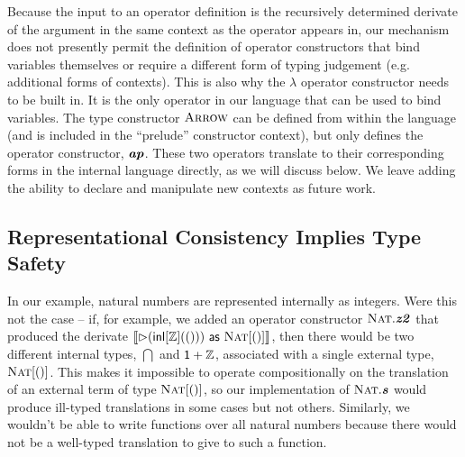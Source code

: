 \documentclass[9pt,preprint]{sigplanconf}
\begin{document}
Because the input to an operator definition is the recursively determined derivate of the argument in the same context as the operator appears in, our mechanism does not presently permit the definition of operator constructors that bind variables themselves or require a different form of typing judgement (e.g. additional forms of contexts). This is also why the $\lambda$ operator constructor needs to be built in. It is the only operator in our language that can be used to bind variables. The type constructor $\textsc{Arrow}$ can be defined from within the language (and is included in the ``prelude'' constructor context), but only defines the operator constructor, $\textbf{\textit{ap}}$. These two operators translate to their corresponding forms in the internal language directly, as we will discuss below. We leave adding the ability to declare and manipulate new contexts as future work.

\subsection{Representational Consistency Implies Type Safety}

In our example, natural numbers are represented internally as integers. Were this not the case -- if, for example, we added an operator constructor $\textsc{Nat}.\textbf{\textit{z2}}$ that produced the derivate $\llbracket \rhd({\sf inl}[\mathbb{Z}](()))~{\sf as}~\textsc{Nat}[()] \rrbracket$, then there would be two different internal types, $\dint$ and $\textsf{1} + \mathbb{Z}$,  associated with a single external type, $\textsc{Nat}[()]$. This makes it impossible to operate compositionally on the translation of an external term of type $\textsc{Nat}[()]$, so our implementation of $\textsc{Nat}.\textbf{\textit{s}}$ would produce ill-typed translations in some cases but not others. Similarly, we wouldn't be able to write functions over all natural numbers because there would not be a well-typed translation to give to such a function.
\end{document}
